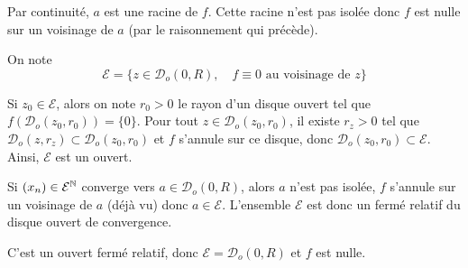 Par continuité, $a$ est une racine de $f$. Cette racine n'est pas isolée donc $f$ est nulle sur un voisinage de $a$ (par le raisonnement qui précède).

On note \[
    \mathcal E=\{z\in \mathcal  D_o(0,R), \quad f\equiv 0\text{ au voisinage de }z\}
\]

Si $z_0\in \mathcal E$, alors on note $r_0>0$ le rayon d'un disque ouvert tel que $f(\mathcal D_o(z_0,r_0))=\{0\}$. Pour tout $z\in \mathcal D_o(z_0, r_0)$, il existe $r_z>0$ tel que $\mathcal D_o(z,r_z)\subset \mathcal D_o(z_0,r_0)$ et $f$ s'annule sur ce disque, donc $\mathcal D_o(z_0, r_0)\subset \mathcal E$. Ainsi, $\mathcal E$ est un ouvert.

Si $(x_n)\in \mathcal E^{\mathbb N}$ converge vers $a\in \mathcal D_o(0, R)$, alors $a$ n'est pas isolée, $f$ s'annule sur un voisinage de $a$ (déjà vu) donc $a\in \mathcal E$. L'ensemble $\mathcal E$ est donc un fermé relatif du disque ouvert de convergence.

C'est un ouvert fermé relatif, donc $\mathcal E=\mathcal D_o(0, R)$ et $f$ est nulle.

\endchapter
